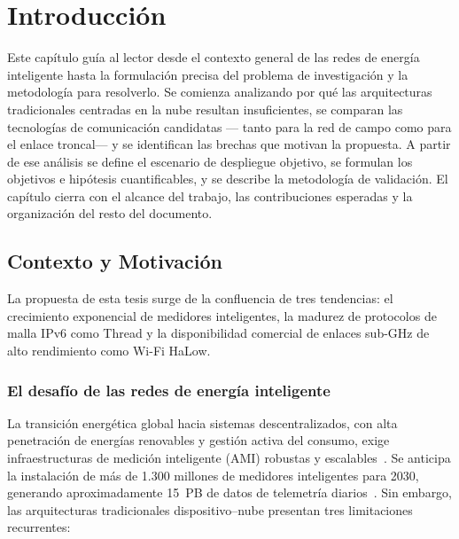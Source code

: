 \chapter{Introducción}
\label{chap:introduccion}

Este capítulo guía al lector desde el contexto general de las redes de energía inteligente hasta la formulación precisa del problema de investigación y la metodología para resolverlo. Se comienza analizando por qué las arquitecturas tradicionales centradas en la nube resultan insuficientes, se comparan las tecnologías de comunicación candidatas --- tanto para la red de campo como para el enlace troncal--- y se identifican las brechas que motivan la propuesta. A partir de ese análisis se define el escenario de despliegue objetivo, se formulan los objetivos e hipótesis cuantificables, y se describe la metodología de validación. El capítulo cierra con el alcance del trabajo, las contribuciones esperadas y la organización del resto del documento.


\section{Contexto y Motivación}
\label{sec:contexto-motivacion}

La propuesta de esta tesis surge de la confluencia de tres tendencias: el crecimiento exponencial de medidores inteligentes, la madurez de protocolos de malla IPv6 como Thread y la disponibilidad comercial de enlaces sub-GHz de alto rendimiento como Wi-Fi HaLow.

\subsection{El desafío de las redes de energía inteligente}

La transición energética global hacia sistemas descentralizados, con alta penetración de energías renovables y gestión activa del consumo, exige infraestructuras de medición inteligente (AMI) robustas y escalables~\cite{velasquezSmartGridsEmpowered2024,gungorSmartGridTechnologies2011}. Se anticipa la instalación de más de 1.300 millones de medidores inteligentes para 2030, generando aproximadamente 15~PB de datos de telemetría diarios~\cite{dianeSystematicComprehensiveReview2025}. Sin embargo, las arquitecturas tradicionales dispositivo--nube presentan tres limitaciones recurrentes:

